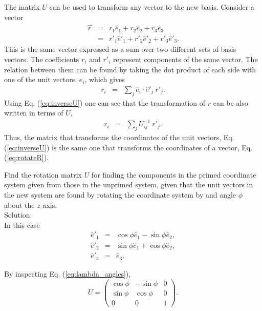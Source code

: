 The matrix $U$ can be used to transform any vector to the new basis. Consider a vector
\begin{eqnarray}
\vec{r}&=&r_1\hat{e}_1+r_2\hat{e}_2+r_3\hat{e}_3\\
\nonumber
&=&r'_1\hat{e}'_1+r'_2\hat{e}'_2+r'_3\hat{e}'_3.
\end{eqnarray}
This is the same vector expressed as a sum over two different sets of basis vectors. The coefficients $r_i$ and $r'_i$ represent components of the same vector. The relation between them can be found by taking the dot product of each side with one of the unit vectors, $\hat{e}_i$, which gives
\begin{eqnarray}
r_i&=&\sum_j \hat{e}_i\cdot\hat{e}'_j~r'_j.
\end{eqnarray}
Using Eq. (\ref{eq:inverseU}) one can see that the transformation of $r$ can be also written in terms of $U$,
\begin{eqnarray}
\label{eq:rotateR}
r_i&=&\sum_jU^{-1}_{ij}~r'_j.
\end{eqnarray}
Thus, the matrix that transforms the coordinates of the unit vectors, Eq. (\ref{eq:inverseU}) is the same one that transforms the coordinates of a vector, Eq. (\ref{eq:rotateR}). 

\example\label{ex:rotmat}
Find the rotation matrix $U$ for finding the components in the primed coordinate system given from those in the unprimed system, given that the unit vectors in the new system are found by rotating the coordinate system by and angle $\phi$ about the $z$ axis.\\
Solution:\\
In this case
\begin{eqnarray*}
\hat{e}'_1&=&\cos\phi \hat{e}_1-\sin\phi\hat{e}_2,\\
\hat{e}'_2&=&\sin\phi\hat{e}_1+\cos\phi\hat{e}_2,\\
\hat{e}'_3&=&\hat{e}_3.
\end{eqnarray*}

By inspecting Eq. (\ref{eq:lambda_angles}),
\[
U=\left(\begin{array}{ccc}
\cos\phi&-\sin\phi&0\\
\sin\phi&\cos\phi&0\\
0&0&1\end{array}\right).
\]
\exampleend

